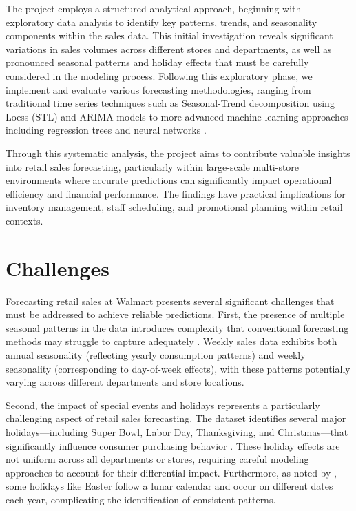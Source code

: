 The project employs a structured analytical approach, beginning with exploratory data analysis to identify key patterns, trends, and seasonality components within the sales data. This initial investigation reveals significant variations in sales volumes across different stores and departments, as well as pronounced seasonal patterns and holiday effects that must be carefully considered in the modeling process. Following this exploratory phase, we implement and evaluate various forecasting methodologies, ranging from traditional time series techniques such as Seasonal-Trend decomposition using Loess (STL) and ARIMA models to more advanced machine learning approaches including regression trees and neural networks \cite{Pao:2017}.

Through this systematic analysis, the project aims to contribute valuable insights into retail sales forecasting, particularly within large-scale multi-store environments where accurate predictions can significantly impact operational efficiency and financial performance. The findings have practical implications for inventory management, staff scheduling, and promotional planning within retail contexts.

\section{Challenges}

Forecasting retail sales at Walmart presents several significant challenges that must be addressed to achieve reliable predictions. First, the presence of multiple seasonal patterns in the data introduces complexity that conventional forecasting methods may struggle to capture adequately \cite{McElroy:2018}. Weekly sales data exhibits both annual seasonality (reflecting yearly consumption patterns) and weekly seasonality (corresponding to day-of-week effects), with these patterns potentially varying across different departments and store locations.

Second, the impact of special events and holidays represents a particularly challenging aspect of retail sales forecasting. The dataset identifies several major holidays—including Super Bowl, Labor Day, Thanksgiving, and Christmas—that significantly influence consumer purchasing behavior \cite{Loyal:2017}. These holiday effects are not uniform across all departments or stores, requiring careful modeling approaches to account for their differential impact. Furthermore, as noted by \cite{McElroy:2018}, some holidays like Easter follow a lunar calendar and occur on different dates each year, complicating the identification of consistent patterns.

